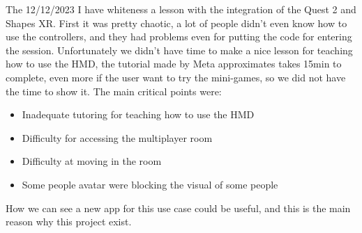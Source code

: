 The 12/12/2023 I have whiteness a lesson with the integration of the Quest 2 and Shapes XR.
First it was pretty chaotic, a lot of people didn’t even know how to use the controllers, and they had problems even for putting the code for entering the session.
Unfortunately we didn’t have time to make a nice lesson for teaching how to use the \ac{HMD}, the tutorial made by Meta approximates takes 15min to complete, even more if the user want to try the mini-games, so we did not have the time to show it.
The main critical points were:

\begin{itemize}
  \item Inadequate tutoring for teaching how to use the \ac{HMD}
  \item Difficulty for accessing the multiplayer room
  \item Difficulty at moving in the room
  \item Some people avatar were blocking the visual of some people
\end{itemize}
\noindent
How we can see a new app for this use case could be useful, and this is the main reason why this project exist.